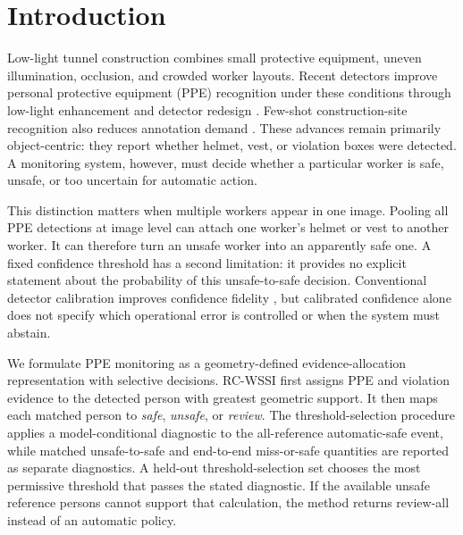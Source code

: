 \documentclass[iicol,pdflatex,sn-mathphys-num]{sn-jnl}
\begin{document}

\maketitle

\section{Introduction}\label{sec:introduction}

Low-light tunnel construction combines small protective equipment, uneven illumination, occlusion, and crowded worker layouts. Recent detectors improve personal protective equipment (PPE) recognition under these conditions through low-light enhancement and detector redesign \cite{wang2023lowlight,malaikrisanachalee2025espcn,wu2025enhanced}. Few-shot construction-site recognition also reduces annotation demand \cite{wang2024fewshot}. These advances remain primarily object-centric: they report whether helmet, vest, or violation boxes were detected. A monitoring system, however, must decide whether a particular worker is safe, unsafe, or too uncertain for automatic action.

This distinction matters when multiple workers appear in one image. Pooling all PPE detections at image level can attach one worker's helmet or vest to another worker. It can therefore turn an unsafe worker into an apparently safe one. A fixed confidence threshold has a second limitation: it provides no explicit statement about the probability of this unsafe-to-safe decision. Conventional detector calibration improves confidence fidelity \cite{oksuz2023selfaware,pathiraja2023multiclass,le2018uncertainty}, but calibrated confidence alone does not specify which operational error is controlled or when the system must abstain.

We formulate PPE monitoring as a geometry-defined evidence-allocation representation with selective decisions. RC-WSSI first assigns PPE and violation evidence to the detected person with greatest geometric support. It then maps each matched person to \emph{safe}, \emph{unsafe}, or \emph{review}. The threshold-selection procedure applies a model-conditional diagnostic to the all-reference automatic-safe event, while matched unsafe-to-safe and end-to-end miss-or-safe quantities are reported as separate diagnostics. A held-out threshold-selection set chooses the most permissive threshold that passes the stated diagnostic. If the available unsafe reference persons cannot support that calculation, the method returns review-all instead of an automatic policy.
\end{document}
